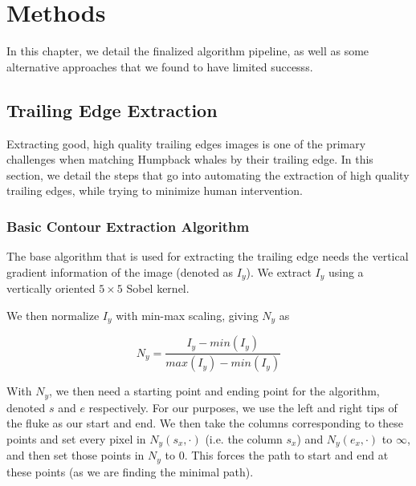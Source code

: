   
\chapter{Methods} \label{sec:methods}

In this chapter, we detail the finalized algorithm pipeline, as well as some alternative approaches that we found to have limited successs.

\section{Trailing Edge Extraction}

Extracting good, high quality trailing edges images is one of the primary challenges when matching Humpback whales by their trailing edge.
In this section, we detail the steps that go into automating the extraction of high quality trailing edges, while trying to minimize human intervention.

\subsection{Basic Contour Extraction Algorithm}

The base algorithm that is used for extracting the trailing edge needs the vertical gradient information of the image (denoted as $I_y$).
We extract $I_y$ using a vertically oriented $5 \times 5$ Sobel kernel. %

We then normalize $I_y$ with min-max scaling, giving $N_y$ as

\begin{equation} \label{norm01}
N_{y} = \frac{I_y - min(I_y)}{max(I_y) - min(I_y)}
\end{equation}

With $N_y$, we then need a starting point and ending point for the algorithm, denoted $s$ and $e$ respectively. 
For our purposes, we use the left and right tips of the fluke as our start and end.
We then take the columns corresponding to these points and set every pixel in $N_y(s_x,\cdot)$ (i.e. the column $s_x$) and $N_y(e_x,\cdot)$ to $\infty$,  and then set those points in $N_y$ to 0. 
This forces the path to start and end at these points (as we are finding the minimal path).

